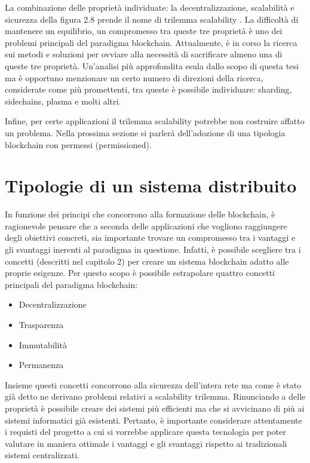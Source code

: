 La combinazione delle proprietà individuate: la decentralizzazione, scalabilità e sicurezza della figura 2.8 prende il nome di trilemma scalability . La difficoltà di mantenere un equilibrio, un compromesso tra queste tre proprietà è uno dei problemi principali del paradigma blockchain. Attualmente, è in corso la ricerca sui metodi e soluzioni per ovviare alla necessità di sacrificare almeno una di queste tre proprietà. Un’analisi più approfondita esula dallo scopo di questa tesi ma è opportuno menzionare un certo numero di direzioni della ricerca, considerate come più promettenti, tra queste è possibile individuare: sharding, sidechains, plasma e molti altri.

Infine, per certe applicazioni il trilemma scalability potrebbe non costruire affatto un problema. Nella prossima sezione si parlerà dell’adozione di una tipologia blockchain con permessi (permissioned).

\section{Tipologie di un sistema distribuito} %

In funzione dei principi che concorrono alla formazione delle blockchain, è ragionevole pensare che a seconda delle applicazioni che vogliono raggiungere degli obiettivi concreti, sia importante trovare un compromesso tra i vantaggi e gli svantaggi inerenti al paradigma in questione. Infatti, è possibile scegliere tra i concetti (descritti nel capitolo 2) per creare un sistema blockchain adatto alle proprie esigenze. Per questo scopo è possibile estrapolare quattro concetti principali del paradigma blockchain: 

\begin{itemize}
\item Decentralizzazione
\item Trasparenza
\item Immutabilità
\item Permanenza
\end{itemize}

Insieme questi concetti concorrono alla sicurezza dell'intera rete ma come è stato già detto ne derivano problemi relativi a scalability trilemma. Rinunciando a delle proprietà è possibile creare dei sistemi più efficienti ma che si avvicinano di più ai sistemi informatici già esistenti. Pertanto, è importante considerare attentamente i requisti del progetto a cui si vorrebbe applicare questa tecnologia per poter valutare in maniera ottimale i vantaggi e gli svantaggi rispetto ai tradizionali sistemi centralizzati.

